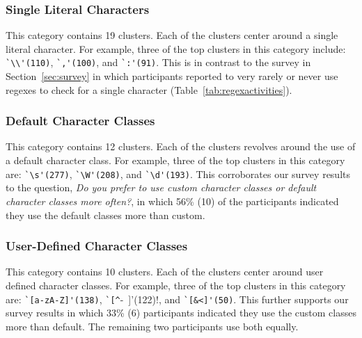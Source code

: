 \subsubsection{Single Literal Characters}
This category contains 19 clusters. Each of the clusters center around a single literal character. For example, three of the top clusters in this category include:
\verb!`\\'(110)!, \verb!`,'(100)!, and \verb!`:'(91)!. This is in contrast to the survey in Section~\ref{sec:survey} in which participants reported to very rarely or never use regexes to check for a single character (Table~\ref{tab:regexactivities}).

\subsubsection{Default Character Classes}
This category contains 12 clusters. Each of the clusters revolves around the use of a default character class. For example, three of the top clusters in this category are:
\verb!`\s'(277)!, \verb!`\W'(208)!, and \verb!`\d'(193)!. This corroborates our survey results to the question, \emph{Do you prefer to use custom character classes or default character classes more often?}, in which 56\% (10) of the participants indicated they use the default classes more than custom.

\subsubsection{User-Defined Character Classes}
This category contains 10 clusters. Each of the clusters center around user defined character classes. For example, three of the top clusters in this category are:
\verb!`[a-zA-Z]'(138)!, \verb!`[^!-~]'(122)!, and \verb!`[&<]'(50)!. This further supports our survey results in which 33\% (6) participants indicated they use the custom classes more than default. The remaining two participants use both equally.


